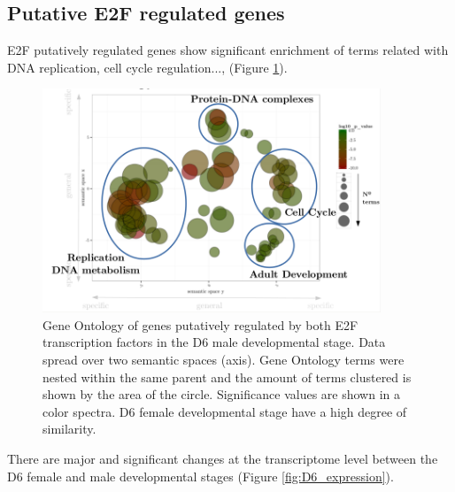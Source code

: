 \documentclass[11pt,twoside,a4paper]{report}
\begin{document}
	\subsection{Putative E2F regulated genes}
		
    	E2F putatively regulated genes show significant enrichment of terms related with DNA replication, cell cycle regulation...,  (Figure \ref{fig:GO}).
		    	
		\begin{figure}[here]
			\centering
			\includegraphics[width=0.9\textwidth]{pngs/E2F_overlap_overlaps_GO.png}
			\caption{Gene Ontology of genes putatively regulated by both E2F transcription factors in the D6 male developmental stage.
				{\footnotesize 
					Data spread over two semantic spaces (axis).
					Gene Ontology terms were nested within the same parent and the amount of terms clustered is shown by the area of the circle.
					Significance values are shown in a color spectra.
					D6 female developmental stage have a high degree of similarity.
				}
			}
			\label{fig:GO}
		\end{figure}

    	There are major and significant changes at the transcriptome level between the D6 female and male developmental stages (Figure \ref{fig:D6_expression}).
		
\end{document}
